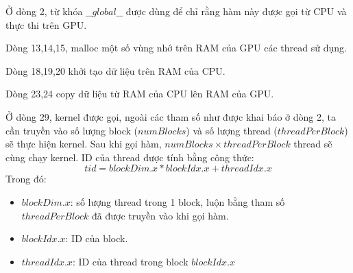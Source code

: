 \documentclass[../../main.tex]{subfiles}
\begin{document}
Ở dòng 2, từ khóa $\_\_global\_\_$ được dùng để chỉ rằng hàm này được gọi từ CPU và thực thi trên GPU. 

Dòng 13,14,15, malloc một số vùng nhớ trên RAM của GPU các thread sử  dụng. 

Dòng 18,19,20 khởi tạo dữ liệu trên RAM của CPU. 

Dòng 23,24 copy dữ liệu từ RAM của CPU lên RAM của GPU. 

Ở dòng 29, kernel được gọi, ngoài các tham số  như được khai báo ở dòng 2, ta cần truyền vào số lượng block ($numBlocks$) và số lượng thread ($threadPerBlock$) sẽ thực hiện kernel. Sau khi gọi hàm, $numBlocks \times threadPerBlock$ thread sẽ cùng chạy kernel. ID của thread được tính bằng công thức:
\begin{equation}
tid = blockDim.x * blockIdx.x + threadIdx.x
\end{equation}
Trong đó:
\begin{itemize}
    \item $blockDim.x$: số lượng thread trong 1 block, luộn bằng tham số $threadPerBlock$ đã được truyền vào khi gọi hàm.
    \item $blockIdx.x$: ID của block.
    \item $threadIdx.x$: ID của thread trong block $blockIdx.x$
\end{itemize}
\end{document}
